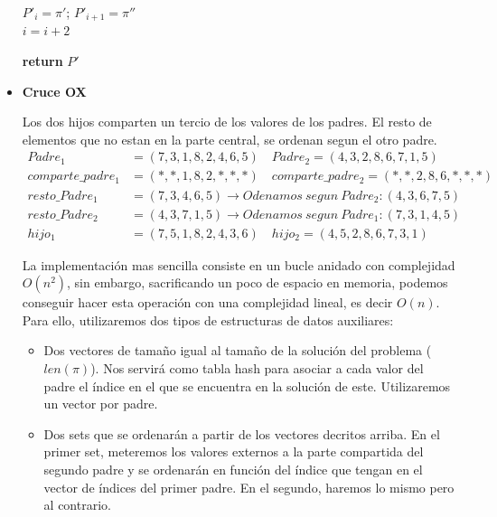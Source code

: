 \documentclass[a4paper, 12pt]{article}
\begin{document}
\begin{itemize}
\begin{algorithm}[H]
{{				$P'_i = \pi'$;\hspace*{0.5cm} $P'_{i+1} = \pi''$\\
         		
         		$i = i + 2$\\
         	}
                    
            
            \textbf{return} $P'$\\
         }
      \end{algorithm}

  		\newpage
      	\item \textbf{Cruce OX}
      	
      	Los dos hijos comparten un tercio de los valores de los padres. El resto de elementos que no estan en la parte central, se ordenan segun el otro padre.
      	\begin{align*}
		Padre_1 &= (7,3,1,8,2,4,6,5) \quad Padre_2 = (4,3,2,8,6,7,1,5)\\
		comparte\_padre_1 &= (*, *, 1, 8, 2, *, *, *) \quad comparte\_padre_2 = (*, *, 2, 8, 6, *, *, *)\\
		resto\_Padre_1 &= (7,3,4,6,5) \rightarrow Odenamos\ segun\ Padre_2: (4,3,6,7,5)\\
		resto\_Padre_2 &= (4,3,7,1,5) \rightarrow Odenamos\ segun\ Padre_1: (7,3,1,4,5)\\
		hijo_1 &= (7,5,1,8,2,4,3,6)\quad hijo_2 = (4,5,2,8,6,7,3,1)
		\end{align*}
		
		La implementación mas sencilla consiste en un bucle anidado con complejidad $O(n^2)$, sin embargo, sacrificando un poco de espacio en memoria, podemos conseguir hacer esta operación con una complejidad lineal, es decir $O(n)$.\\
		
		Para ello, utilizaremos dos tipos de estructuras de datos auxiliares:
		\begin{itemize}
			\item Dos vectores de tamaño igual al tamaño de la solución del problema ($len(\pi)$). Nos servirá como tabla hash para asociar a cada valor del padre el índice en el que se encuentra en la solución de este. Utilizaremos un vector por padre.
			
			\item Dos sets que se ordenarán a partir de los vectores decritos arriba. En el primer set, meteremos los valores externos a la parte compartida del segundo padre y se ordenarán en función del índice que tengan en el vector de índices del primer padre. En el segundo, haremos lo mismo pero al contrario.\\
		\end{itemize}
		

\end{itemize}
\end{document}
